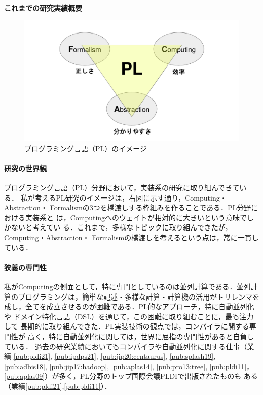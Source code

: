 \documentclass[dvipdfmx]{jsarticle}
\begin{document}
\begin{center}
\LARGE\bfseries これまでの研究実績概要
\end{center}

\begin{figure}
 \centering
 \includegraphics[width=\linewidth,trim=120 20 120 40]{PL-overview.pdf}
 \caption{プログラミング言語（PL）のイメージ}\label{fig:PL-overview}
\end{figure}
\paragraph{研究の世界観}
プログラミング言語（PL）分野において，実装系の研究に取り組んできている．
私が考えるPL研究のイメージは，右図に示す通り，Computing・Abstraction・
Formalismの3つを橋渡しする枠組みを作ることである．PL分野における実装系と
は，Computingへのウェイトが相対的に大きいという意味でしかないと考えてい
る．これまで，多様なトピックに取り組んできたが，Computing・Abstraction・
Formalismの橋渡しを考えるという点は，常に一貫している．

\paragraph{狭義の専門性}
私がComputingの側面として，特に専門としているのは並列計算である．並列計
算のプログラミングは，簡単な記述・多様な計算・計算機の活用がトリレンマを
成し，全てを成立させるのが困難である．PL的なアプローチ，特に自動並列化や
ドメイン特化言語（DSL）を通じて，この困難に取り組むことに，最も注力して
長期的に取り組んできた．PL実装技術の観点では，コンパイラに関する専門性が
高く，特に自動並列化に関しては，世界に屈指の専門性があると自負している．
過去の研究業績においてもコンパイラや自動並列化に関する仕事（業績
\ref{pub:pldi21}, \ref{pub:ipdps21}, \ref{pub:jip20:centaurus},
\ref{pub:splash19}, \ref{pub:adbis18}, \ref{pub:jip17:hadoop},
\ref{pub:aplas14}, \ref{pub:pro13:tree}, \ref{pub:pldi11}，
\ref{pub:aplas09}）が多く，PL分野のトップ国際会議PLDIで出版されたものも
ある（業績\ref{pub:pldi21},\ref{pub:pldi11}）．
\end{document}
